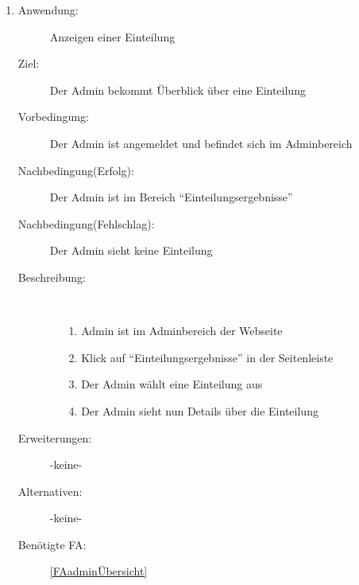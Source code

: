 \documentclass[parskip=full]{scrartcl}
\newcommand{\swtLabel}[1]{\textbf{/#1\arabic*0/}}
\begin{document}
\begin{enumerate} [label=\swtLabel{A}]
  \item \label{UCadminEinteilungUebersicht}
    \begin{description}
  	\item[Anwendung:] Anzeigen einer \gls{Einteilung}
  	\item[Ziel:] Der \gls{Admin} bekommt Überblick über eine \gls{Einteilung}
  	\item[Vorbedingung:] Der \gls{Admin} ist angemeldet und befindet sich im \gls{Admin}bereich
  	\item[Nachbedingung(Erfolg):] Der \gls{Admin} ist im Bereich
  	\enquote{\gls{Einteilung}sergebnisse}
  	\item[Nachbedingung(Fehlschlag):] Der \gls{Admin} sieht keine \gls{Einteilung}
  	\item[Beschreibung:]~
  	\begin{enumerate}
  	  \item[1.] \gls{Admin} ist im \gls{Admin}bereich der Webseite
      \item[2.] Klick auf \enquote{\gls{Einteilung}sergebnisse} in der Seitenleiste
      \item[3.] Der \gls{Admin} wählt eine \gls{Einteilung} aus
      \item[4.] Der \gls{Admin} sieht nun Details über die \gls{Einteilung}
  	\end{enumerate}
  	\item[Erweiterungen:] -keine-
  	\item[Alternativen:] -keine-
  	\item[Benötigte FA:] \ref{FAadminÜbersicht}
  \end{description}
  

\end{enumerate}
\end{document}
